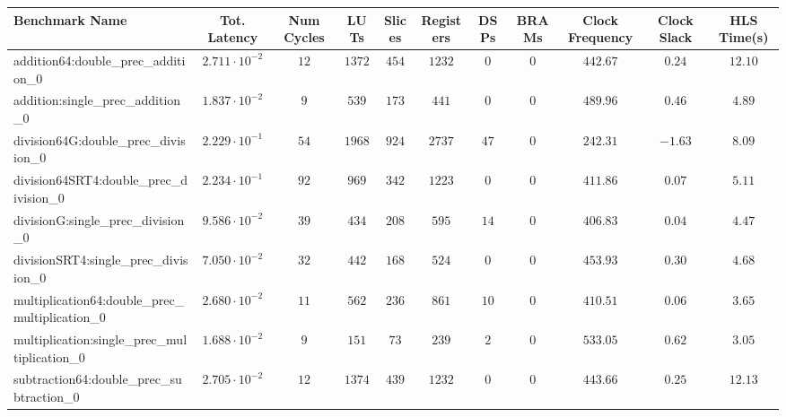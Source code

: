\begin{tabular}{|l|c|c|c|c|c|c|c|c|c|c|}
\hline
Benchmark Name                                   & Tot. Latency            & Num Cycles & LUTs     & Slices   & Registers & DSPs   & BRAMs & Clock Frequency & Clock Slack & HLS Time(s) \\
\hline
addition64:double\_prec\_addition\_0             & $ 2.711 \cdot 10^{-2} $ & $ 12     $ & $ 1372 $ & $ 454  $ & $ 1232  $ & $ 0  $ & $ 0 $ & $ 442.67      $ & $ 0.24    $ & $ 12.10   $ \\
addition:single\_prec\_addition\_0               & $ 1.837 \cdot 10^{-2} $ & $ 9      $ & $ 539  $ & $ 173  $ & $ 441   $ & $ 0  $ & $ 0 $ & $ 489.96      $ & $ 0.46    $ & $ 4.89    $ \\
division64G:double\_prec\_division\_0            & $ 2.229 \cdot 10^{-1} $ & $ 54     $ & $ 1968 $ & $ 924  $ & $ 2737  $ & $ 47 $ & $ 0 $ & $ 242.31      $ & $ -1.63   $ & $ 8.09    $ \\
division64SRT4:double\_prec\_division\_0         & $ 2.234 \cdot 10^{-1} $ & $ 92     $ & $ 969  $ & $ 342  $ & $ 1223  $ & $ 0  $ & $ 0 $ & $ 411.86      $ & $ 0.07    $ & $ 5.11    $ \\
divisionG:single\_prec\_division\_0              & $ 9.586 \cdot 10^{-2} $ & $ 39     $ & $ 434  $ & $ 208  $ & $ 595   $ & $ 14 $ & $ 0 $ & $ 406.83      $ & $ 0.04    $ & $ 4.47    $ \\
divisionSRT4:single\_prec\_division\_0           & $ 7.050 \cdot 10^{-2} $ & $ 32     $ & $ 442  $ & $ 168  $ & $ 524   $ & $ 0  $ & $ 0 $ & $ 453.93      $ & $ 0.30    $ & $ 4.68    $ \\
multiplication64:double\_prec\_multiplication\_0 & $ 2.680 \cdot 10^{-2} $ & $ 11     $ & $ 562  $ & $ 236  $ & $ 861   $ & $ 10 $ & $ 0 $ & $ 410.51      $ & $ 0.06    $ & $ 3.65    $ \\
multiplication:single\_prec\_multiplication\_0   & $ 1.688 \cdot 10^{-2} $ & $ 9      $ & $ 151  $ & $ 73   $ & $ 239   $ & $ 2  $ & $ 0 $ & $ 533.05      $ & $ 0.62    $ & $ 3.05    $ \\
subtraction64:double\_prec\_subtraction\_0       & $ 2.705 \cdot 10^{-2} $ & $ 12     $ & $ 1374 $ & $ 439  $ & $ 1232  $ & $ 0  $ & $ 0 $ & $ 443.66      $ & $ 0.25    $ & $ 12.13   $ \\

\end{tabular}
